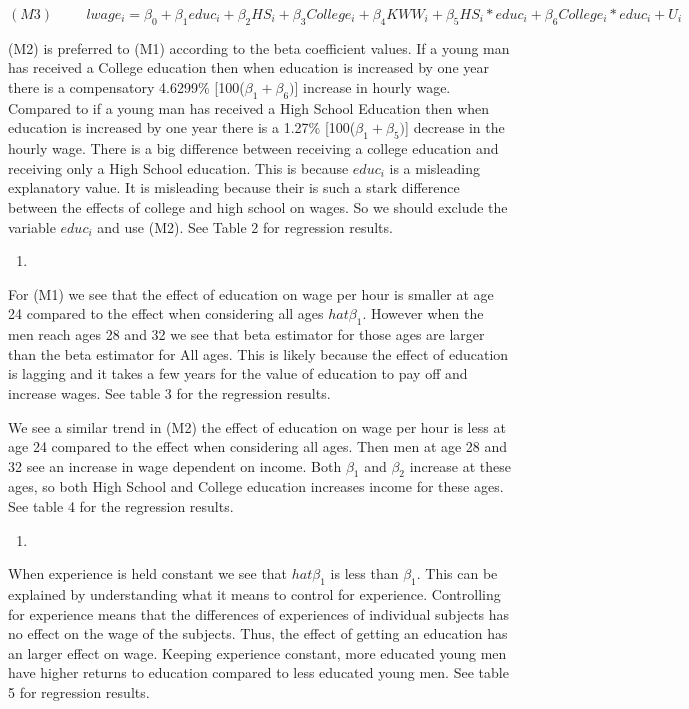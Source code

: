 \documentclass[
  12pt,
  landscape]{article}
\begin{document}
\[
(M3) \hspace{1cm} lwage_i = \beta_0 + \beta_1educ_i + \beta_2HS_i + \beta_3College_i + \beta_4KWW_i +  \beta_5HS_i*educ_i +  \beta_6College_i*educ_i + U_i
\]

(M2) is preferred to (M1) according to the beta coefficient values. If a
young man has received a College education then when education is
increased by one year there is a compensatory 4.6299\%
{[}100(\({\beta_1 + \beta_6)}\){]} increase in hourly wage. Compared to
if a young man has received a High School Education then when education
is increased by one year there is a 1.27\%
{[}100(\({\beta_1 + \beta_5)}\){]} decrease in the hourly wage. There is
a big difference between receiving a college education and receiving
only a High School education. This is because \({educ_i}\) is a
misleading explanatory value. It is misleading because their is such a
stark difference between the effects of college and high school on
wages. So we should exclude the variable \({educ_i}\) and use (M2). See
Table 2 for regression results.

\begin{enumerate}
\def\labelenumi{(\alph{enumi})}
\setcounter{enumi}{4}
\item
\end{enumerate}

For (M1) we see that the effect of education on wage per hour is smaller
at age 24 compared to the effect when considering all ages
\(hat{\beta_1}\). However when the men reach ages 28 and 32 we see that
beta estimator for those ages are larger than the beta estimator for All
ages. This is likely because the effect of education is lagging and it
takes a few years for the value of education to pay off and increase
wages. See table 3 for the regression results.

We see a similar trend in (M2) the effect of education on wage per hour
is less at age 24 compared to the effect when considering all ages. Then
men at age 28 and 32 see an increase in wage dependent on income. Both
\({\beta_1}\) and \({\beta_2}\) increase at these ages, so both High
School and College education increases income for these ages. See table
4 for the regression results.

\begin{enumerate}
\def\labelenumi{(\alph{enumi})}
\setcounter{enumi}{5}
\item
\end{enumerate}

When experience is held constant we see that \(hat{\beta_1}\) is less
than \({\beta_1}\). This can be explained by understanding what it means
to control for experience. Controlling for experience means that the
differences of experiences of individual subjects has no effect on the
wage of the subjects. Thus, the effect of getting an education has an
larger effect on wage. Keeping experience constant, more educated young
men have higher returns to education compared to less educated young
men. See table 5 for regression results.
\end{document}
